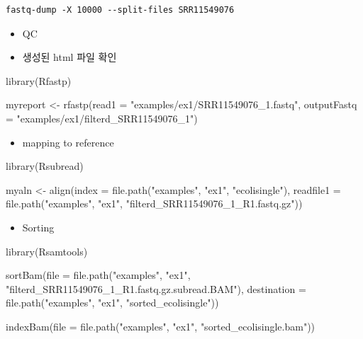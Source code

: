 \documentclass[
]{book}
\newenvironment{Shaded}{\begin{snugshade}}{\end{snugshade}}
\newcommand{\AttributeTok}[1]{\textcolor[rgb]{0.77,0.63,0.00}{#1}}
\newcommand{\FunctionTok}[1]{\textcolor[rgb]{0.00,0.00,0.00}{#1}}
\newcommand{\NormalTok}[1]{#1}
\newcommand{\OtherTok}[1]{\textcolor[rgb]{0.56,0.35,0.01}{#1}}
\newcommand{\StringTok}[1]{\textcolor[rgb]{0.31,0.60,0.02}{#1}}
\providecommand{\tightlist}{%
  \setlength{\itemsep}{0pt}\setlength{\parskip}{0pt}}
\begin{document}
\begin{verbatim}
fastq-dump -X 10000 --split-files SRR11549076
\end{verbatim}

\begin{itemize}
\tightlist
\item
  QC
\item
  생성된 html 파일 확인
\end{itemize}

\begin{Shaded}
\begin{Highlighting}[]
\FunctionTok{library}\NormalTok{(Rfastp)}

\NormalTok{myreport }\OtherTok{\textless{}{-}} \FunctionTok{rfastp}\NormalTok{(}\AttributeTok{read1 =} \StringTok{"examples/ex1/SRR11549076\_1.fastq"}\NormalTok{, }
       \AttributeTok{outputFastq =} \StringTok{"examples/ex1/filterd\_SRR11549076\_1"}\NormalTok{)}
\end{Highlighting}
\end{Shaded}

\begin{itemize}
\tightlist
\item
  mapping to reference
\end{itemize}

\begin{Shaded}
\begin{Highlighting}[]
\FunctionTok{library}\NormalTok{(Rsubread)}

\NormalTok{myaln }\OtherTok{\textless{}{-}} \FunctionTok{align}\NormalTok{(}\AttributeTok{index =} \FunctionTok{file.path}\NormalTok{(}\StringTok{"examples"}\NormalTok{, }\StringTok{"ex1"}\NormalTok{, }\StringTok{"ecolisingle"}\NormalTok{),}
               \AttributeTok{readfile1 =} \FunctionTok{file.path}\NormalTok{(}\StringTok{"examples"}\NormalTok{, }\StringTok{"ex1"}\NormalTok{, }\StringTok{"filterd\_SRR11549076\_1\_R1.fastq.gz"}\NormalTok{))}
\end{Highlighting}
\end{Shaded}

\begin{itemize}
\tightlist
\item
  Sorting
\end{itemize}

\begin{Shaded}
\begin{Highlighting}[]
\FunctionTok{library}\NormalTok{(Rsamtools)}

\FunctionTok{sortBam}\NormalTok{(}\AttributeTok{file =} \FunctionTok{file.path}\NormalTok{(}\StringTok{"examples"}\NormalTok{, }\StringTok{"ex1"}\NormalTok{, }\StringTok{"filterd\_SRR11549076\_1\_R1.fastq.gz.subread.BAM"}\NormalTok{),}
        \AttributeTok{destination =} \FunctionTok{file.path}\NormalTok{(}\StringTok{"examples"}\NormalTok{, }\StringTok{"ex1"}\NormalTok{, }\StringTok{"sorted\_ecolisingle"}\NormalTok{))}

\FunctionTok{indexBam}\NormalTok{(}\AttributeTok{file =} \FunctionTok{file.path}\NormalTok{(}\StringTok{"examples"}\NormalTok{, }\StringTok{"ex1"}\NormalTok{, }\StringTok{"sorted\_ecolisingle.bam"}\NormalTok{))}
\end{Highlighting}
\end{Shaded}
\end{document}
